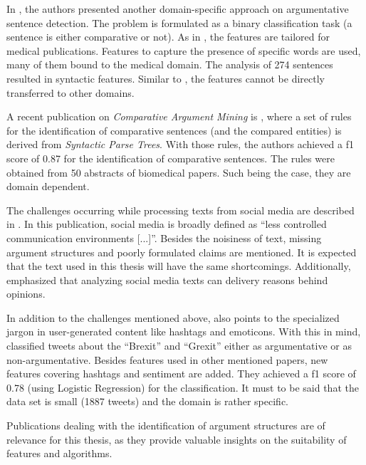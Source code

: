 In \cite{park2012identifying}, the authors presented another domain-specific approach on argumentative sentence detection. The problem is formulated as a binary classification task (a sentence is either comparative or not). As in \cite{fiszman2007interpreting}, the features are tailored for medical publications. Features to capture the presence of specific words are used, many of them bound to the medical domain. The analysis of 274 sentences resulted in syntactic features. Similar to \cite{fiszman2007interpreting}, the features cannot be directly transferred to other domains.

A recent publication on \emph{Comparative Argument Mining} is \cite{gupta2017identifying}, where a set of rules for the identification of comparative sentences (and the compared entities) is derived from \emph{Syntactic Parse Trees}. With those rules, the authors achieved a f1 score of 0.87 for the identification of comparative sentences. The rules were obtained from 50 abstracts of biomedical papers. Such being the case, they are domain dependent.\newline

The challenges occurring while processing texts from social media are described in \cite{Snajder2017Social-Media-Ar}.  In this publication, social media is broadly defined as \enquote{less controlled communication environments [...]}. Besides the noisiness of text, missing argument structures and poorly formulated claims are mentioned. It is expected that the text used in this thesis will have the same shortcomings. Additionally, \cite{Snajder2017Social-Media-Ar} emphasized that analyzing social media texts can delivery reasons behind opinions.

In addition to the challenges mentioned above, \cite{Dusmanu2017Argument-Mining} also points to the specialized jargon in user-generated content like hashtags and emoticons. With this in mind, \cite{Dusmanu2017Argument-Mining} classified tweets about the \enquote{Brexit} and \enquote{Grexit} either as argumentative or as non-argumentative. Besides features used in other mentioned papers, new features covering hashtags and sentiment are added. They achieved a f1 score of 0.78 (using Logistic Regression) for the classification. It must to be said that the data set is small (1887 tweets) and the domain is rather specific.\newline

Publications dealing with the identification of argument structures are of relevance for this thesis, as they provide valuable insights on the suitability of features and algorithms.

